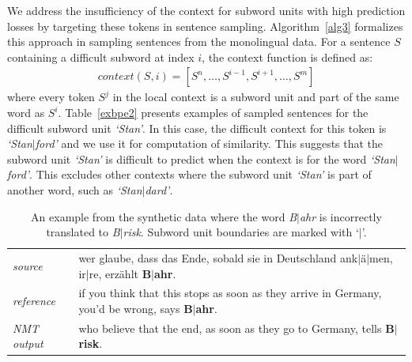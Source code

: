 We address the insufficiency of the context for subword units with high prediction losses by targeting these tokens in sentence sampling.
Algorithm~\ref{alg3} formalizes this approach in sampling sentences from the monolingual data.
For a sentence $S$ containing a difficult subword at index $i$, the context function is defined as:
\begin{align}
context(S, i) = [ S^{n},\ldots, S^{i-1}, S^{i+1}, \ldots, S^{m} ]
\end{align}
where every token $S^{j}$ in the local context is a subword unit and part of the same word as $S^i$.
Table~\ref{exbpe2} presents examples of sampled sentences for the difficult subword unit \textit{`Stan'}.
In this case, the difficult context for this token is \textit{`Stan$\mid$ford'} and we use it for computation of similarity.
This suggests that the subword unit \textit{`Stan'} is difficult to predict when the context is for the word \textit{`Stan$\mid$ford'}.
This excludes other contexts where the subword unit \textit{`Stan'} is part of another word, such as \textit{`Stan$\mid$dard'}.
%
\begin{table}[thb!]
\begin{center}\small
\caption{\label{exbpe1} An example from the synthetic data where the word \textit{B$\mid$ahr} is incorrectly translated to \textit{B$\mid$risk}. Subword unit boundaries are marked with `$\mid$'.}
\begin{tabularx}{0.7\columnwidth}{lX}
\toprule
\textit{source} & wer glaube, dass das Ende, sobald sie in Deutschland ank$\mid${\"a}$\mid$men, ir$\mid$re, erz{\"a}hlt \textbf{B$\mid$ahr}. \\
\textit{reference } & if you think that this stops as soon as they arrive in Germany, you'd be wrong, says \textbf{B$\mid$ahr}.\\
\textit{NMT output} & who believe that the end, as soon as they go to Germany, tells \textbf{B$\mid$risk}.\\
\bottomrule
\end{tabularx}
\end{center}
\end{table}
%
